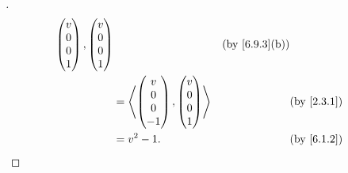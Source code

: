 \begin{proof}[]
\begin{align*}
{\begin{pmatrix}
                                                                        v \\
                                                                        0 \\
                                                                        0 \\
                                                                        1
                                                                      \end{pmatrix}, \begin{pmatrix}
                                                                                       v \\
                                                                                       0 \\
                                                                                       0 \\
                                                                                       1
                                                                                     \end{pmatrix}} &  & \by{6.9.3}[b] \\
                                         & = \inn{\begin{pmatrix}
                                                      v \\
                                                      0 \\
                                                      0 \\
                                                      -1
                                                    \end{pmatrix}, \begin{pmatrix}
                                                                     v \\
                                                                     0 \\
                                                                     0 \\
                                                                     1
                                                                   \end{pmatrix}} &  & \by{2.3.1}                      \\
                                         & = v^2 - 1.                     &  & \by{6.1.2}

\end{align*}
\end{proof}
